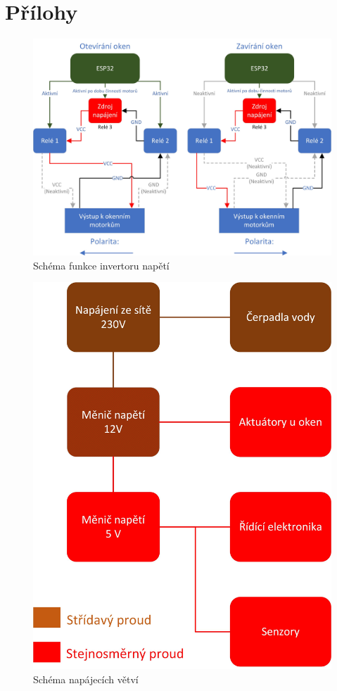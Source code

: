 \chapter*{Přílohy}

\begin{figure}[htbp]
    \includegraphics[width=\textwidth]{img/okna.jpg}
    \caption{Schéma funkce invertoru napětí}
    \label{fig:okna_invertory}
\end{figure} 

\begin{figure}[htbp]
 	\includegraphics[width=\textwidth]{img/napajeni.jpg}
 	\caption{Schéma napájecích větví}
 	\label{fig:napajeni_vetve}
\end{figure}

